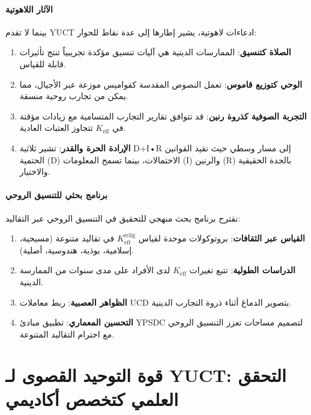 \documentclass[12pt,a4paper]{article}
\begin{document}
	\subsection{الآثار اللاهوتية}
	
	بينما لا تقدم YUCT ادعاءات لاهوتية، يشير إطارها إلى عدة نقاط للحوار:
	\begin{enumerate}
		\item \textbf{الصلاة كتنسيق}: الممارسات الدينية هي آليات تنسيق مؤكدة تجريبياً تنتج تأثيرات قابلة للقياس.
		
		\item \textbf{الوحي كتوزيع قاموس}: تعمل النصوص المقدسة كقواميس موزعة عبر الأجيال، مما يمكن من تجارب روحية منسقة.
		
		\item \textbf{التجربة الصوفية كذروة رنين}: قد تتوافق تقارير التجارب المتسامية مع زيادات مؤقتة في \(K_{\mathrm{eff}}\) تتجاوز العتبات العادية.
		
		\item \textbf{الإرادة الحرة والقدر}: تشير ثلاثية D+I•R إلى مسار وسطي حيث تقيد القوانين الحتمية (D) الاحتمالات، بينما تسمح المعلومات (I) والرنين (R) بالجدة الحقيقية والاختيار.
	\end{enumerate}
	
	\subsection{برنامج بحثي للتنسيق الروحي}
	
	نقترح برنامج بحث منهجي للتحقيق في التنسيق الروحي عبر التقاليد:
	\begin{enumerate}
		\item \textbf{القياس عبر الثقافات}: بروتوكولات موحدة لقياس \(K_{\mathrm{eff}}^{\mathrm{relig}}\) في تقاليد متنوعة (مسيحية، إسلامية، بوذية، هندوسية، أصلية).
		
		\item \textbf{الدراسات الطولية}: تتبع تغيرات \(K_{\mathrm{eff}}\) لدى الأفراد على مدى سنوات من الممارسة الدينية.
		
		\item \textbf{الظواهر العصبية}: ربط معاملات UCD بتصوير الدماغ أثناء ذروة التجارب الدينية.
		
		\item \textbf{التحسين المعماري}: تطبيق مبادئ YPSDC لتصميم مساحات تعزز التنسيق الروحي مع احترام التقاليد المتنوعة.
	\end{enumerate}
	
	\newpage
	\part{قوة التوحيد القصوى لـ YUCT: التحقق العلمي كتخصص أكاديمي}
	
\end{document}
